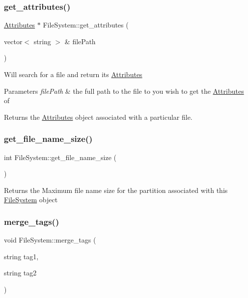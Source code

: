 \subsubsection{\texorpdfstring{get\+\_\+attributes()}{get\_attributes()}}
{\footnotesize\ttfamily \mbox{\hyperlink{classAttributes}{Attributes}} $\ast$ File\+System\+::get\+\_\+attributes (\begin{DoxyParamCaption}\item[{vector$<$ string $>$ \&}]{file\+Path }\end{DoxyParamCaption})}

Will search for a file and return its \mbox{\hyperlink{classAttributes}{Attributes}} 
\begin{DoxyParams}{Parameters}
{\em file\+Path} & the full path to the file to you wish to get the \mbox{\hyperlink{classAttributes}{Attributes}} of \\
\hline
\end{DoxyParams}
\begin{DoxyReturn}{Returns}
the \mbox{\hyperlink{classAttributes}{Attributes}} object associated with a particular file. 
\end{DoxyReturn}
\mbox{\label{classFileSystem_a0444400c1e30b7981123ba6991798c86}} 
\subsubsection{\texorpdfstring{get\+\_\+file\+\_\+name\+\_\+size()}{get\_file\_name\_size()}}
{\footnotesize\ttfamily int File\+System\+::get\+\_\+file\+\_\+name\+\_\+size (\begin{DoxyParamCaption}{ }\end{DoxyParamCaption})}

\begin{DoxyReturn}{Returns}
the Maximum file name size for the partition associated with this \mbox{\hyperlink{classFileSystem}{File\+System}} object 
\end{DoxyReturn}
\mbox{\label{classFileSystem_a639cbe0f8e5be5793cc20594c493a2c8}} 
\subsubsection{\texorpdfstring{merge\+\_\+tags()}{merge\_tags()}}
{\footnotesize\ttfamily void File\+System\+::merge\+\_\+tags (\begin{DoxyParamCaption}\item[{string}]{tag1,  }\item[{string}]{tag2 }\end{DoxyParamCaption})}

